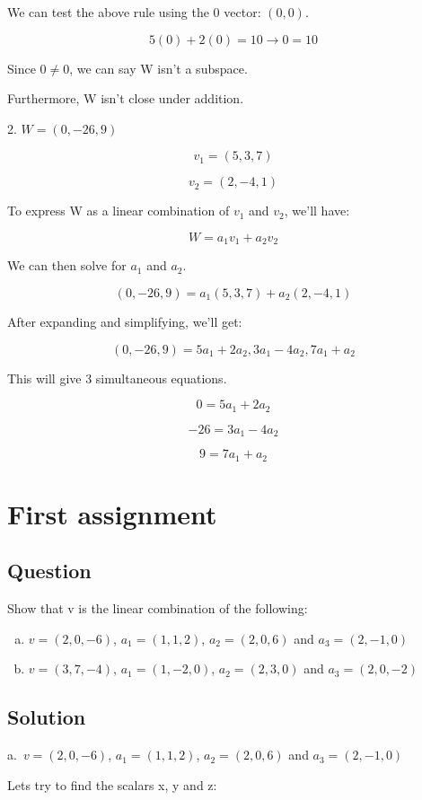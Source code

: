 \documentclass{book}
\begin{document}
We can test the above rule using the 0 vector: \((0, 0)\).

\[5(0) + 2(0) = 10 \rightarrow 0 = 10\]

Since \(0 \neq 0\), we can say W isn't a subspace.

Furthermore, W isn't close under addition.

2. \( W = (0, -26, 9) \)

\[ v_1 = (5, 3, 7) \]

\[ v_2 = (2, -4, 1) \]

To express W as a linear combination of \(v_1\) and \(v_2\), we'll have:

\[W = a_1 v_1 + a_2 v_2\]

We can then solve for \(a_1\) and \(a_2\).

\[(0, -26, 9) = a_1 (5, 3, 7) + a_2 (2, -4, 1)\]

After expanding and simplifying, we'll get:

\[(0, -26, 9) = 5 a_1 + 2 a_2, 3 a_1 - 4 a_2, 7 a_1 + a_2\]

This will give 3 simultaneous equations.

\[0 = 5 a_1 + 2 a_2\]

\[-26 = 3 a_1 - 4 a_2\]

\[9 = 7 a_1 + a_2\]

\section{First assignment}
\subsection{Question}
Show that v is the linear combination of the following:

\begin{enumerate}[a.]
	\item \(v = (2, 0, -6)\), \(a_1 = (1, 1, 2)\), \(a_2 = (2, 0, 6)\) and \(a_3 = (2, -1, 0)\)
	\item \(v = (3, 7, -4)\), \(a_1 = (1, -2, 0)\), \(a_2 = (2, 3, 0)\) and \(a_3 = (2, 0, -2)\)
\end{enumerate}

\subsection*{Solution}
a.\, \(v = (2, 0, -6)\), \(a_1 = (1, 1, 2)\), \(a_2 = (2, 0, 6)\) and \(a_3 = (2, -1, 0)\)

Lets try to find the scalars x, y and z:
\end{document}
